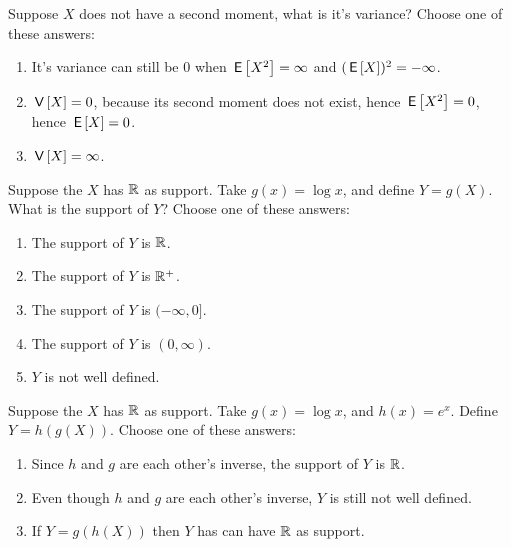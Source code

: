 \documentclass[poll_tutorial_format]{subfiles}
\begin{document}
\begin{exercise}
Suppose $X$ does not have a second moment, what is it's variance?
Choose one of these answers:
\begin{enumerate}
\item It's variance can still be $0$ when $\,\mathsf{E}\left[X^2\right] = \infty$ and $(\,\mathsf{E}\left[X\right])^2=-\infty$.
\item $\,\mathsf{V}\left[X\right]=0$, because its second moment does not exist, hence $\,\mathsf{E}\left[X^2\right]=0$, hence $\,\mathsf{E}\left[X\right]=0$.
\item $\,\mathsf{V}\left[X\right] = \infty$.
\end{enumerate}
\end{exercise}

\begin{exercise}
Suppose the $X$ has  $\mathbb{R}$ as support. Take $g(x) = \log x$, and define $Y = g(X)$. What is the support of $Y$?
Choose one of these answers:
\begin{enumerate}
\item The support of $Y$ is $\mathbb{R}$.
\item The support of $Y$ is $\mathbb{R}^+$.
\item The support of $Y$ is $(-\infty, 0]$.
\item The support of $Y$ is $(0, \infty)$.
\item $Y$ is not well defined.
\end{enumerate}

\end{exercise}

\begin{exercise}
Suppose the $X$ has  $\mathbb{R}$ as support. Take $g(x) = \log x$, and $h(x) = e^{x}$. Define $Y = h(g(X))$.
Choose one of these answers:
\begin{enumerate}
\item Since $h$ and $g$ are each other's inverse, the support of $Y$ is $\mathbb{R}$.
\item Even though $h$ and $g$ are each other's inverse, $Y$ is still not well defined.
\item If $Y=g(h(X))$ then $Y$ has can have $\mathbb{R}$ as support.
\end{enumerate}

\end{exercise}
\end{document}
